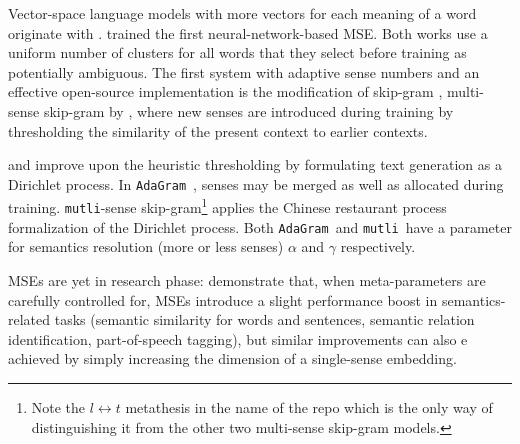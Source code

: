 \documentclass[11pt]{article}
\newcommand{\adagram}{\texttt{AdaGram}}
\newcommand{\mutli}{\texttt{mutli}}
\begin{document}
\label{sec:mse}

Vector-space language models with more vectors for each meaning of a
word originate with \cite{Reisinger:2010}.
\cite{Huang:2012} trained the first neural-network-based MSE.
Both works use a uniform number of clusters for all words that they select
before training as potentially ambiguous.
The first system with adaptive sense numbers and an effective open-source
implementation is the
modification of skip-gram \cite{Mikolov:2013d}, multi-sense skip-gram by
\cite{Neelakantan:2014}, where new senses are introduced during training by
thresholding the similarity of the present context to earlier contexts.



\cite{Bartunov:2015} and \cite{Li:2015} improve upon the heuristic thresholding
by formulating text generation as a Dirichlet process. In
\adagram~\citep{Bartunov:2015}, senses may be merged as well as allocated
during training. \mutli-sense skip-gram\footnote{Note the $l\leftrightarrow
t$ metathesis in the name of the repo which is the only way of distinguishing it
from the other two multi-sense skip-gram models.} \citep{Li:2015} applies the
Chinese restaurant process formalization of the Dirichlet process. Both
\adagram~and \mutli~have a parameter for semantics resolution (more or less
senses) $\alpha$ and $\gamma$ respectively.


MSEs are yet in research phase: \cite{Li:2015}  demonstrate that, when
meta-parameters are carefully controlled for, MSEs introduce a slight
performance boost in semantics-related tasks (semantic similarity for words and
sentences, semantic relation identification, part-of-speech tagging), but
similar improvements can also e achieved by simply increasing the dimension of
a single-sense embedding.
\end{document}
